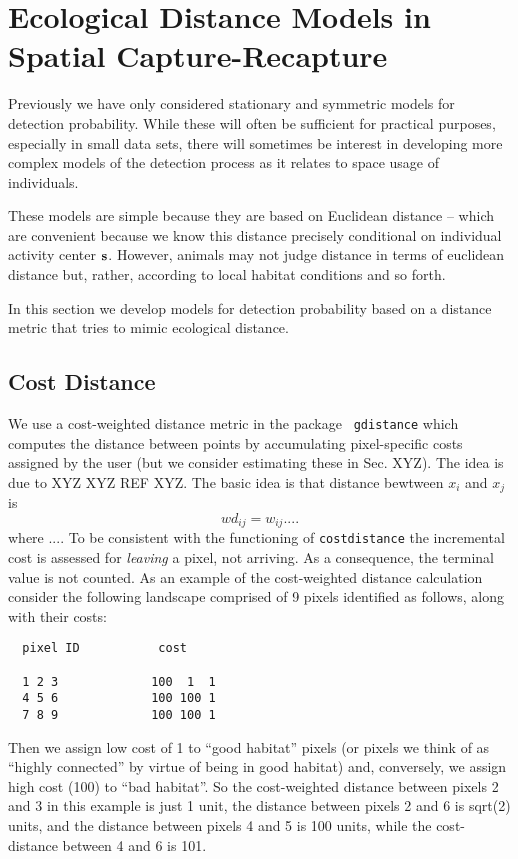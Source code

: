 \chapter{
Ecological Distance Models in Spatial Capture-Recapture
}
\label{chapt.implicit}


\vspace{.3in}


Previously we have only considered stationary and symmetric models for
detection probability. While these will often be sufficient for
practical purposes, especially in small data sets, there will
sometimes be interest in developing more complex models of the
detection process as it relates to space usage of individuals.  

These models are simple because they are based on
Euclidean distance -- which are convenient because we know this
distance precisely conditional on individual activity center ${\bf s}$.
However, animals may not
judge distance in terms of euclidean distance but, rather, according
to local habitat conditions and so forth. 

In this section we develop models for detection probability based on a
distance metric that tries to mimic ecological distance. 

\section{Cost Distance}

We use a cost-weighted distance metric in the package \mbox{\tt
  gdistance} which computes the distance between points by
accumulating pixel-specific costs assigned by the user (but we
consider estimating these in Sec. XYZ). The idea is due to XYZ XYZ REF
XYZ. The basic idea is that distance bewtween $x_{i}$ and $x_{j}$ is
\[
 wd_{ij} =  w_{ij} ....
\]
where ....
To be consistent with the functioning of \mbox{\tt costdistance} the
incremental cost is assessed for {\it leaving} a pixel, not
arriving. As a consequence, the terminal value is not counted. 
As an example of the cost-weighted distance calculation consider the
following landscape comprised of 9 pixels identified as follows, along
with their costs:
\begin{verbatim}
  pixel ID           cost

  1 2 3             100  1  1 
  4 5 6             100 100 1
  7 8 9             100 100 1

\end{verbatim}
Then we assign low cost of 1 to ``good habitat'' pixels (or pixels we think of as
``highly connected'' by virtue of being in good habitat) and,
conversely, we 
assign high cost (100) to ``bad habitat''. So the cost-weighted distance
between pixels 2 and 3 in this example is just 1 unit, the distance
between pixels 2 and 6 is sqrt(2) units, and the distance between
pixels 4 and 5 is 100 units, while the cost-distance between 4 and 6 is 101.



